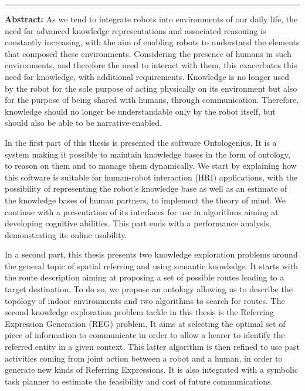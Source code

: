 \documentclass[english,a4paper,11pt,twoside]{StyleThese}
\begin{document}
\cleardoublepage
\begin{vcenterpage}
\noindent\rule[2pt]{\textwidth}{0.5pt}


\textbf{Abstract:}
As we tend to integrate robots into environments of our daily life, the need for advanced knowledge representations and associated reasoning is constantly increasing, with the aim of enabling robots to understand the elements that composed these environments. Considering the presence of humans in such environments, and therefore the need to interact with them, this exacerbates this need for knowledge, with additional requirements. Knowledge is no longer used by the robot for the sole purpose of acting physically on its environment but also for the purpose of being shared with humans, through communication. Therefore, knowledge should no longer be understandable only by the robot itself, but should also be able to be narrative-enabled. %

In the first part of this thesis is presented the software Ontologenius. It is a system making it possible to maintain knowledge bases in the form of ontology, to reason on them and to manage them dynamically. We start by explaining how this software is suitable for human-robot interaction (HRI) applications, with the possibility of representing the robot's knowledge base as well as an estimate of the knowledge bases of human partners, to implement the theory of mind. We continue with a presentation of its interfaces for use in algorithms aiming at developing cognitive abilities. This part ends with a performance analysis, demonstrating its online usability. %

In a second part, this thesis presents two knowledge exploration problems around the general topic of spatial referring and using semantic knowledge. It starts with the route description aiming at proposing a set of possible routes leading to a target destination. To do so, we propose an ontology allowing us to describe the topology of indoor environments and two algorithms to search for routes. The second knowledge exploration problem tackle in this thesis is the Referring Expression Generation (REG) problem. It aims at selecting the optimal set of piece of information to communicate in order to allow a hearer to identify the referred entity in a given context. This latter algorithm is then refined to use past activities coming from joint action between a robot and a human, in order to generate new kinds of Referring Expressions. It is also integrated with a symbolic task planner to estimate the feasibility and cost of future communications. %


\end{vcenterpage}
\end{document}
